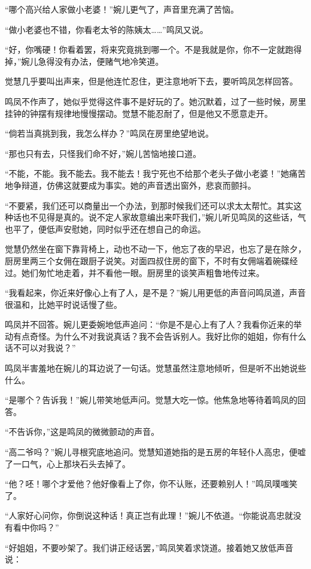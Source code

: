 \par “哪个高兴给人家做小老婆！”婉儿更气了，声音里充满了苦恼。
\par “做小老婆也不错，你看老太爷的陈姨太……”鸣凤又说。
\par “好，你嘴硬！你看着罢，将来究竟挑到哪一个。不是我就是你，你不一定就跑得掉，”婉儿急得没有办法，便赌气地冷笑道。
\par 觉慧几乎要叫出声来，但是他连忙忍住，更注意地听下去，要听鸣凤怎样回答。
\par 鸣凤不作声了，她似乎觉得这件事不是好玩的了。她沉默着，过了一些时候，房里挂钟的钟摆有规律地慢慢摆动。觉慧不能忍耐了，但是他又不愿意走开。
\par “倘若当真挑到我，我怎么样办？”鸣凤在房里绝望地说。
\par “那也只有去，只怪我们命不好，”婉儿苦恼地接口道。
\par “不能，不能。我不能去。我不能去！我宁死也不给那个老头子做小老婆！”她痛苦地争辩道，仿佛这就要成为事实。她的声音透出窗外，悲哀而颤抖。
\par “不要紧，我们还可以商量出一个办法，到那时候我们还可以求太太帮忙。其实这种话也不见得是真的。说不定人家故意编出来吓我们，”婉儿听见鸣凤的这些话，气也平了，便低声安慰她，同时似乎还在想自己的命运。
\par 觉慧仍然坐在窗下靠背椅上，动也不动一下，他忘了夜的早迟，也忘了是在除夕，厨房里两三个女佣在跟厨子说笑。对面四叔住房的窗下，不时有女佣端着碗碟经过。她们匆忙地走着，并不看他一眼。厨房里的谈笑声粗鲁地传过来。
\par “我看起来，你近来好像心上有了人，是不是？”婉儿用更低的声音问鸣凤道，声音很温和，比她平时说话慢了些。
\par 鸣凤并不回答。婉儿更委婉地低声追问：“你是不是心上有了人？我看你近来的举动有点奇怪。为什么不对我说真话？我不会告诉别人。我好比你的姐姐，你有什么话不可以对我说？”
\par 鸣凤半害羞地在婉儿的耳边说了一句话。觉慧虽然注意地倾听，但是听不出她说些什么。
\par “是哪个？告诉我！”婉儿带笑地低声问。觉慧大吃一惊。他焦急地等待着鸣凤的回答。
\par “不告诉你，”这是鸣凤的微微颤动的声音。
\par “高二爷吗？”婉儿寻根究底地追问。觉慧知道她指的是五房的年轻仆人高忠，便嘘了一口气，心上那块石头去掉了。
\par “他？呸！哪个才爱他？他好像看上了你，你不认账，还要赖别人！”鸣凤噗嗤笑了。
\par “人家好心问你，你倒说这种话！真正岂有此理！”婉儿不依道。“你能说高忠就没有看中你吗？”
\par “好姐姐，不要吵架了。我们讲正经话罢，”鸣凤笑着求饶道。接着她又放低声音说：
